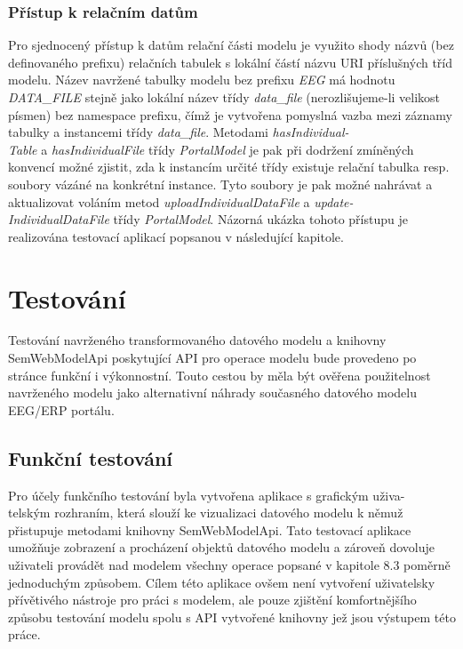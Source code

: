 \documentclass{projekt}
\begin{document}
\subsection{Přístup k relačním datům}
\hspace{0.65cm}Pro sjednocený přístup k datům relační části modelu je využito shody názvů (bez definovaného prefixu) relačních tabulek s lokální částí názvu URI příslušných tříd modelu. Název navržené tabulky modelu bez prefixu {\it EEG} má hodnotu {\it DATA\_FILE} stejně jako lokální název třídy {\it data\_file} (nerozlišujeme-li velikost písmen) bez namespace prefixu, čímž je vytvořena pomyslná vazba mezi záznamy tabulky a instancemi třídy {\it data\_file}. Metodami {\it hasIndividual-\\Table} a {\it hasIndividualFile} třídy {\it PortalModel} je pak při dodržení zmíněných konvencí možné zjistit, zda k instancím určité třídy existuje relační tabulka resp. soubory vázáné na konkrétní instance. Tyto soubory je pak možné nahrávat a aktualizovat voláním metod {\it uploadIndividualDataFile} a {\it update-\\IndividualDataFile} třídy {\it PortalModel}. Názorná ukázka tohoto přístupu je realizována testovací aplikací popsanou v následující kapitole.


\chapter{Testování}
\hspace{0.65cm}Testování navrženého transformovaného datového modelu a knihovny SemWebModelApi poskytující API pro operace modelu bude provedeno po stránce funkční i výkonnostní. Touto cestou by měla být ověřena použitelnost navrženého modelu jako alternativní náhrady současného datového modelu EEG/ERP portálu.

\section{Funkční testování}
\hspace{0.65cm}Pro účely funkčního testování byla vytvořena aplikace s grafickým uživa-\\telským rozhraním, která slouží ke vizualizaci datového modelu k němuž přistupuje metodami knihovny SemWebModelApi. Tato testovací aplikace umožňuje zobrazení a procházení objektů datového modelu a zároveň dovoluje uživateli provádět nad modelem všechny operace popsané v kapitole 8.3 poměrně jednoduchým způsobem. Cílem této aplikace ovšem není vytvoření uživatelsky přívětivého nástroje pro práci s modelem, ale pouze zjištění komfortnějšího způsobu testování modelu spolu s API vytvořené knihovny jež jsou výstupem této práce.
\end{document}
